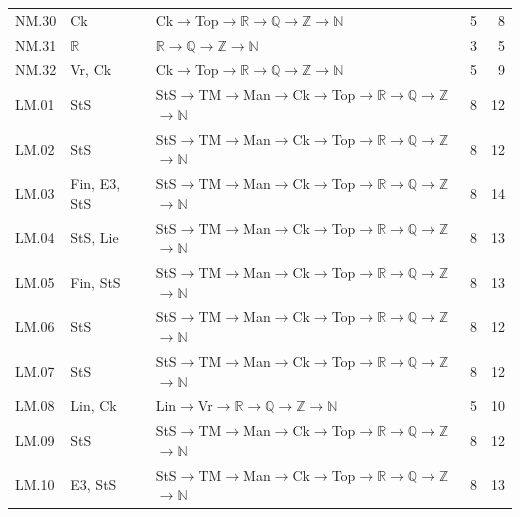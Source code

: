 {\begin{longtable}{l p{4.6cm} p{7.4cm} r r}
NM.30 & \textsf{Ck} & \textsf{Ck}$\to$\textsf{Top}$\to$$\mathbb R$$\to$$\mathbb Q$$\to$$\mathbb Z$$\to$$\mathbb N$ & 5 & 8 \\
NM.31 & $\mathbb R$ & $\mathbb R$$\to$$\mathbb Q$$\to$$\mathbb Z$$\to$$\mathbb N$ & 3 & 5 \\
NM.32 & \textsf{Vr}, \textsf{Ck} & \textsf{Ck}$\to$\textsf{Top}$\to$$\mathbb R$$\to$$\mathbb Q$$\to$$\mathbb Z$$\to$$\mathbb N$ & 5 & 9 \\
LM.01 & \textsf{StS} & \textsf{StS}$\to$\textsf{TM}$\to$\textsf{Man}$\to$\textsf{Ck}$\to$\textsf{Top}$\to$$\mathbb R$$\to$$\mathbb Q$$\to$$\mathbb Z$$\to$$\mathbb N$ & 8 & 12 \\
LM.02 & \textsf{StS} & \textsf{StS}$\to$\textsf{TM}$\to$\textsf{Man}$\to$\textsf{Ck}$\to$\textsf{Top}$\to$$\mathbb R$$\to$$\mathbb Q$$\to$$\mathbb Z$$\to$$\mathbb N$ & 8 & 12 \\
LM.03 & \textsf{Fin}, \textsf{E3}, \textsf{StS} & \textsf{StS}$\to$\textsf{TM}$\to$\textsf{Man}$\to$\textsf{Ck}$\to$\textsf{Top}$\to$$\mathbb R$$\to$$\mathbb Q$$\to$$\mathbb Z$$\to$$\mathbb N$ & 8 & 14 \\
LM.04 & \textsf{StS}, \textsf{Lie} & \textsf{StS}$\to$\textsf{TM}$\to$\textsf{Man}$\to$\textsf{Ck}$\to$\textsf{Top}$\to$$\mathbb R$$\to$$\mathbb Q$$\to$$\mathbb Z$$\to$$\mathbb N$ & 8 & 13 \\
LM.05 & \textsf{Fin}, \textsf{StS} & \textsf{StS}$\to$\textsf{TM}$\to$\textsf{Man}$\to$\textsf{Ck}$\to$\textsf{Top}$\to$$\mathbb R$$\to$$\mathbb Q$$\to$$\mathbb Z$$\to$$\mathbb N$ & 8 & 13 \\
LM.06 & \textsf{StS} & \textsf{StS}$\to$\textsf{TM}$\to$\textsf{Man}$\to$\textsf{Ck}$\to$\textsf{Top}$\to$$\mathbb R$$\to$$\mathbb Q$$\to$$\mathbb Z$$\to$$\mathbb N$ & 8 & 12 \\
LM.07 & \textsf{StS} & \textsf{StS}$\to$\textsf{TM}$\to$\textsf{Man}$\to$\textsf{Ck}$\to$\textsf{Top}$\to$$\mathbb R$$\to$$\mathbb Q$$\to$$\mathbb Z$$\to$$\mathbb N$ & 8 & 12 \\
LM.08 & \textsf{Lin}, \textsf{Ck} & \textsf{Lin}$\to$\textsf{Vr}$\to$$\mathbb R$$\to$$\mathbb Q$$\to$$\mathbb Z$$\to$$\mathbb N$ & 5 & 10 \\
LM.09 & \textsf{StS} & \textsf{StS}$\to$\textsf{TM}$\to$\textsf{Man}$\to$\textsf{Ck}$\to$\textsf{Top}$\to$$\mathbb R$$\to$$\mathbb Q$$\to$$\mathbb Z$$\to$$\mathbb N$ & 8 & 12 \\
LM.10 & \textsf{E3}, \textsf{StS} & \textsf{StS}$\to$\textsf{TM}$\to$\textsf{Man}$\to$\textsf{Ck}$\to$\textsf{Top}$\to$$\mathbb R$$\to$$\mathbb Q$$\to$$\mathbb Z$$\to$$\mathbb N$ & 8 & 13 \\

\end{longtable}}
